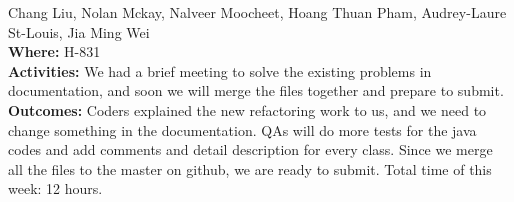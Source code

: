 \documentclass[12pt]{article}
\begin{document}
Chang Liu, Nolan Mckay, Nalveer Moocheet, Hoang Thuan Pham, Audrey-Laure St-Louis, Jia Ming Wei\\
{\bf Where:} H-831\\
{\bf Activities:} We had a brief meeting to solve the existing problems in documentation, and soon we will merge the files together and prepare to submit.\\ 
{\bf Outcomes:} Coders explained the new refactoring work to us, and we need to change something in the documentation. QAs will do more tests for the java codes and add comments and detail description for every class. Since we merge all the files to the master on github, we are ready to submit. Total time of this week: 12 hours.\\\\
\end{document}
